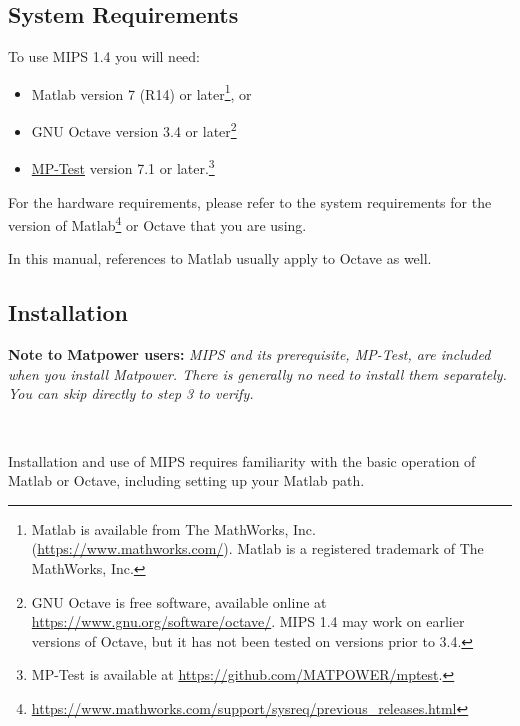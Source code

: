 \documentclass[12pt]{article}
\newcommand{\matlab}[0]{{\sc Matlab}}
\newcommand{\matpower}[0]{{\sc Matpower}}
\newcommand{\mptest}[0]{{MP-Test}}
\newcommand{\mptesturl}[0]{https://github.com/MATPOWER/mptest}
\newcommand{\mptestlink}[0]{\href{\mptesturl}{\mptest{}}}
\newcommand{\mips}[0]{{MIPS}}
\newcommand{\mipsver}[0]{1.4}
\numberwithin{equation}{section}
\numberwithin{table}{section}
\numberwithin{figure}{section}
\begin{document}
\subsection{System Requirements}
\label{sec:sysreq}
To use \mips{} \mipsver{} you will need:
\begin{itemize}
\item \matlab{}\textsuperscript{\tiny \textregistered} version 7 (R14) or later\footnote{\matlab{} is available from The MathWorks, Inc. (\url{https://www.mathworks.com/}). \matlab{} is a registered trademark of The MathWorks, Inc.}, or
\item GNU Octave version 3.4 or later\footnote{GNU Octave \cite{octave} is free software, available online at \url{https://www.gnu.org/software/octave/}. \mips{} \mipsver{} may work on earlier versions of Octave, but it has not been tested on versions prior to 3.4.}
\item \mptestlink{} version 7.1 or later.\footnote{\mptest{} is available at \url{\mptesturl}.}
\end{itemize}

For the hardware requirements, please refer to the system requirements for the version of \matlab{}\footnote{\url{https://www.mathworks.com/support/sysreq/previous_releases.html}} or Octave that you are using.

In this manual, references to \matlab{} usually apply to Octave as well.

\subsection{Installation}
\label{sec:installation}

{\bf Note to \matpower{} users:} \emph{\mips{} and its prerequisite, \mptest{}, are included when you install \matpower{}. There is generally no need to install them separately. You can skip directly to step 3 to verify.}

~

Installation and use of \mips{} requires familiarity with the basic operation of \matlab{} or Octave, including setting up your \matlab{} path.
\end{document}
